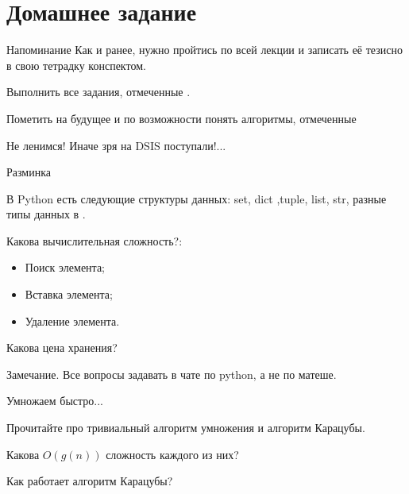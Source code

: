 \section{Домашнее задание}

\begin{frame}
	\begin{block}{Напоминание}
		Как и ранее, нужно пройтись по всей лекции и записать её тезисно в свою тетрадку конспектом.
		
		Выполнить все задания, отмеченные .
		
		Пометить на будущее и по возможности понять алгоритмы, отмеченные 
		
		Не ленимся! Иначе зря на DSIS поступали!...
	\end{block}
\end{frame}


\begin{frame}{Разминка}
	

	В Python есть следующие структуры данных:
	set, dict ,tuple, list, str, разные типы данных в .
	
	
	Какова вычислительная сложность?:
	\begin{itemize}
		\item Поиск элемента;
		\item Вставка элемента;
		\item Удаление элемента.
	\end{itemize}

	Какова цена хранения?
	
	\begin{block}{Замечание.}
		Все вопросы задавать в чате по python, а не по матеше.
	\end{block}
	
	
\end{frame}

\begin{frame}{Умножаем быстро...}
	
	Прочитайте про тривиальный алгоритм умножения и алгоритм Карацубы.
	
	Какова $O(g(n))$ сложность каждого из них?
	
	Как работает алгоритм Карацубы?
	
\end{frame}

